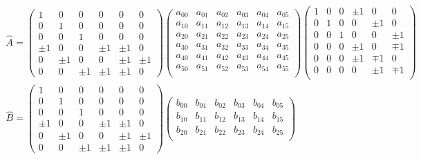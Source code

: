 \begin{gather*} \widehat{A}=\begin{pmatrix}
1 & 0 & 0 & 0 & 0 & 0\\
0 & 1 & 0 & 0 & 0 & 0\\
0 & 0 & 1 & 0 & 0 & 0\\
\pm 1 & 0 & 0 & \pm 1 & \pm 1 & 0\\
0 & \pm 1 & 0 & 0 & \pm 1 & \pm 1\\
0 & 0 & \pm 1 & \pm 1 & \pm 1 & 0
\end{pmatrix}\begin{pmatrix}
a_{00} & a_{01} & a_{02} & a_{03} & a_{04} & a_{05}\\
a_{10} & a_{11} & a_{12} & a_{13} & a_{14} & a_{15}\\
a_{20} & a_{21} & a_{22} & a_{23} & a_{24} & a_{25}\\
a_{30} & a_{31} & a_{32} & a_{33} & a_{34} & a_{35}\\
a_{40} & a_{41} & a_{42} & a_{43} & a_{44} & a_{45}\\
a_{50} & a_{51} & a_{52} & a_{53} & a_{54} & a_{55}\\
\end{pmatrix}\begin{pmatrix}
1 & 0 & 0 & \pm 1 & 0 & 0\\
0 & 1 & 0 & 0 & \pm 1 & 0\\
0 & 0 & 1 & 0 & 0 & \pm 1\\
0 & 0 & 0 & \pm 1 & 0 & \mp 1\\
0 & 0 & 0 & \pm 1 & \mp 1 & 0\\
0 & 0 & 0 & 0 & \pm 1 & \mp 1\\
\end{pmatrix}\\
\widehat{B}=\begin{pmatrix}
1 & 0 & 0 & 0 & 0 & 0\\
0 & 1 & 0 & 0 & 0 & 0\\
0 & 0 & 1 & 0 & 0 & 0\\
\pm 1 & 0 & 0 & \pm 1 & \pm 1 & 0\\
0 & \pm 1 & 0 & 0 & \pm 1 & \pm 1\\
0 & 0 & \pm 1 & \pm 1 & \pm 1 & 0
\end{pmatrix}\begin{pmatrix}
b_{00} & b_{01} & b_{02} & b_{03} & b_{04} & b_{05}\\
b_{10} & b_{11} & b_{12} & b_{13} & b_{14} & b_{15}\\
b_{20} & b_{21} & b_{22} & b_{23} & b_{24} & b_{25}\\

\end{pmatrix}
\end{gather*}
